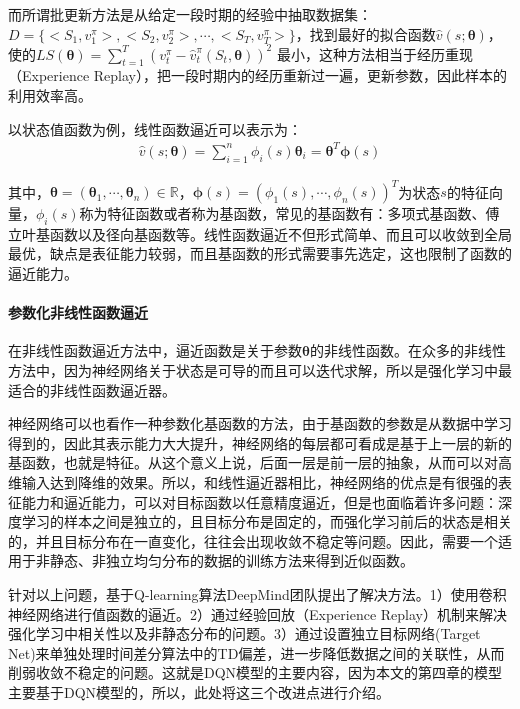而所谓批更新方法是从给定一段时期的经验中抽取数据集：$D=\{<S_{1},v^{\pi}_{1}>,<S_{2},v^{\pi}_{2}>,\cdots,<S_{T},v^{\pi}_{T}>\}$，找到最好的拟合函数$\hat{v}(s;\bm{\theta})$，使的$LS(\bm{\theta})=\sum_{t=1}^{T}(v^{\pi}_{t}-\hat{v}^{\pi}_{t}(S_{t},\bm{\theta}))^2$ 最小，这种方法相当于经历重现（Experience Replay），把一段时期内的经历重新过一遍，更新参数，因此样本的利用效率高。

以状态值函数为例，线性函数逼近可以表示为：
\begin{equation}
\begin{aligned}
\hat{v}(s;\bm{\theta})=\sum^{n}_{i=1}\phi_{i}(s) \bm{\theta}_{i}=\bm{\theta }^{T} \bm{\phi}(s)
\end{aligned}
\end{equation}

其中，$\bm{\theta}=(\bm{\theta}_{1},\cdots,\bm{\theta}_{n}) \in \mathbb{R}$，$\bm{\phi}(s)=(\phi_{1}(s),\cdots,\phi_{n}(s))^{T}$为状态$s$的特征向量，$\phi_{i}(s)$称为特征函数或者称为基函数，常见的基函数有：多项式基函数、傅立叶基函数以及径向基函数等。线性函数逼近不但形式简单、而且可以收敛到全局最优，缺点是表征能力较弱，而且基函数的形式需要事先选定，这也限制了函数的逼近能力。


\paragraph{参数化非线性函数逼近}
在非线性函数逼近方法中，逼近函数是关于参数$\bm{\theta}$的非线性函数。在众多的非线性方法中，因为神经网络关于状态是可导的而且可以迭代求解，所以是强化学习中最适合的非线性函数逼近器。

神经网络可以也看作一种参数化基函数的方法，由于基函数的参数是从数据中学习得到的，因此其表示能力大大提升，神经网络的每层都可看成是基于上一层的新的基函数，也就是特征。从这个意义上说，后面一层是前一层的抽象，从而可以对高维输入达到降维的效果。所以，和线性逼近器相比，神经网络的优点是有很强的表征能力和逼近能力，可以对目标函数以任意精度逼近，但是也面临着许多问题：深度学习的样本之间是独立的，且目标分布是固定的，而强化学习前后的状态是相关的，并且目标分布在一直变化，往往会出现收敛不稳定等问题。因此，需要一个适用于非静态、非独立均匀分布的数据的训练方法来得到近似函数。

针对以上问题，基于Q-learning算法DeepMind团队提出了解决方法。1）使用卷积神经网络进行值函数的逼近。2）通过经验回放（Experience Replay）机制来解决强化学习中相关性以及非静态分布的问题。3）通过设置独立目标网络(Target Net)来单独处理时间差分算法中的TD偏差，进一步降低数据之间的关联性，从而削弱收敛不稳定的问题。这就是DQN模型的主要内容，因为本文的第四章的模型主要基于DQN模型的，所以，此处将这三个改进点进行介绍。

